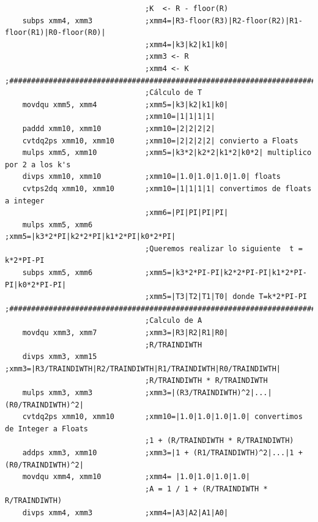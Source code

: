 \begin{codesnippet}
\begin{verbatim}
                                ;K  <- R - floor(R)
    subps xmm4, xmm3            ;xmm4=|R3-floor(R3)|R2-floor(R2)|R1-floor(R1)|R0-floor(R0)|								
                                ;xmm4=|k3|k2|k1|k0|
                                ;xmm3 <- R
                                ;xmm4 <- K
;######################################################################################
                                ;Cálculo de T
    movdqu xmm5, xmm4           ;xmm5=|k3|k2|k1|k0|
                                ;xmm10=|1|1|1|1| 
    paddd xmm10, xmm10          ;xmm10=|2|2|2|2|
    cvtdq2ps xmm10, xmm10       ;xmm10=|2|2|2|2| convierto a Floats
    mulps xmm5, xmm10           ;xmm5=|k3*2|k2*2|k1*2|k0*2| multiplico por 2 a los k's
    divps xmm10, xmm10          ;xmm10=|1.0|1.0|1.0|1.0| floats
    cvtps2dq xmm10, xmm10       ;xmm10=|1|1|1|1| convertimos de floats a integer
                                ;xmm6=|PI|PI|PI|PI|
    mulps xmm5, xmm6            ;xmm5=|k3*2*PI|k2*2*PI|k1*2*PI|k0*2*PI|
                                ;Queremos realizar lo siguiente  t = k*2*PI-PI
    subps xmm5, xmm6            ;xmm5=|k3*2*PI-PI|k2*2*PI-PI|k1*2*PI-PI|k0*2*PI-PI|
                                ;xmm5=|T3|T2|T1|T0| donde T=k*2*PI-PI 
;######################################################################################
                                ;Calculo de A
    movdqu xmm3, xmm7           ;xmm3=|R3|R2|R1|R0|
                                ;R/TRAINDIWTH
    divps xmm3, xmm15           ;xmm3=|R3/TRAINDIWTH|R2/TRAINDIWTH|R1/TRAINDIWTH|R0/TRAINDIWTH|
                                ;R/TRAINDIWTH * R/TRAINDIWTH
    mulps xmm3, xmm3            ;xmm3=|(R3/TRAINDIWTH)^2|...|(R0/TRAINDIWTH)^2|
    cvtdq2ps xmm10, xmm10       ;xmm10=|1.0|1.0|1.0|1.0| convertimos de Integer a Floats
                                ;1 + (R/TRAINDIWTH * R/TRAINDIWTH)
    addps xmm3, xmm10           ;xmm3=|1 + (R1/TRAINDIWTH)^2|...|1 + (R0/TRAINDIWTH)^2|
    movdqu xmm4, xmm10          ;xmm4= |1.0|1.0|1.0|1.0|
                                ;A = 1 / 1 + (R/TRAINDIWTH * R/TRAINDIWTH)
    divps xmm4, xmm3            ;xmm4=|A3|A2|A1|A0|
\end{verbatim}
\end{codesnippet}

